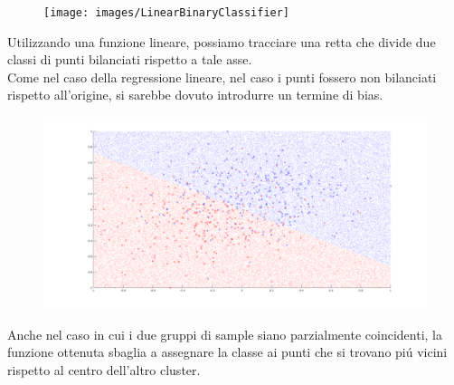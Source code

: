 \documentclass[12pt]{article}
\begin{document}
\begin{figure}[H]
  \centering
  \texttt{[image: images/LinearBinaryClassifier]}
\end{figure}
Utilizzando una funzione lineare, possiamo tracciare una retta
che divide due classi di punti bilanciati rispetto a tale asse. \\
Come nel caso della regressione lineare, nel caso i punti fossero non bilanciati
rispetto all'origine, si sarebbe dovuto introdurre un termine di bias.
\begin{figure}[H]
  \centering
  \includegraphics[width=\textwidth]{images/LinearBinaryClassifier2}
\end{figure}
Anche nel caso in cui i due gruppi di sample siano parzialmente coincidenti,
la funzione ottenuta sbaglia a assegnare la classe ai punti che si trovano piú vicini
rispetto al centro dell'altro cluster.
\end{document}

